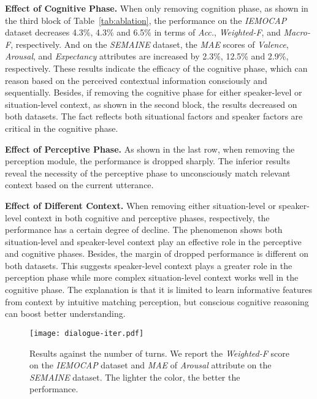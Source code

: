 \documentclass[11pt,a4paper]{article}
\begin{document}
\textbf{Effect of Cognitive Phase.}
When only removing cognition phase, as shown in the third block of Table~\ref{tab:ablation},
the performance on the \textit{IEMOCAP} dataset decreases 4.3\%, 4.3\% and 6.5\% in terms of \textit{Acc.}, \textit{Weighted-F}, and  \textit{Macro-F}, respectively.
And on the \textit{SEMAINE} dataset, the {\it MAE} scores of {\it Valence}, {\it Arousal}, and {\it Expectancy} attributes are increased by 2.3\%, 12.5\% and 2.9\%, respectively. 
These results indicate the efficacy of the cognitive phase, which can reason based on the perceived contextual information consciously and sequentially.
Besides, if removing the cognitive phase for either speaker-level or situation-level context, as shown in the second block, the results decreased on both datasets.
The fact reflects both situational factors and speaker factors are critical in the cognitive phase.


  
\textbf{Effect of Perceptive Phase.}
As shown in the last row, when removing the perception module, the performance is dropped sharply.
The inferior results reveal the necessity of the perceptive phase to unconsciously match relevant context based on the current utterance.


\textbf{Effect of Different Context.}
When removing either situation-level or speaker-level context in both cognitive and perceptive phases, respectively, the performance has a certain degree of decline.
The phenomenon shows both situation-level and speaker-level context play an effective role in the perceptive and cognitive phases. 
Besides, the margin of dropped performance is different on both datasets.
This suggests speaker-level context plays a greater role in the perception phase while more complex situation-level context works well in the cognitive phase.
The explanation is that it is limited to learn informative features from context by intuitive matching perception, but conscious cognitive reasoning can boost better understanding.




\begin{figure}[t]
  \centering
  \texttt{[image: dialogue-iter.pdf]} \caption{Results against the number of turns. We report the \textit{Weighted-F} score on the {\it IEMOCAP} dataset and {\it MAE} of \textit{Arousal} attribute on the \textit{SEMAINE} dataset. The lighter the color, the better the performance.
  }
  \label{fig:param}
\end{figure}
\end{document}
